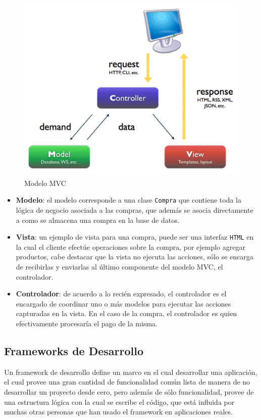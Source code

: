 \begin{figure}[!h]
  \centering
  \includegraphics[scale=.5]{images/mvc.png}
  \caption{Modelo MVC}
  \label{modelomvc}
\end{figure}

\begin{itemize}
  \item \textbf{Modelo}: el modelo corresponde a una clase \texttt{Compra} que contiene toda la lógica de negocio asociada a las compras, que además se asocia directamente a como se almacena una compra en la base de datos.
  \item \textbf{Vista}: un ejemplo de vista para una compra, puede ser una interfaz \texttt{HTML} en la cual el cliente efectúe operaciones sobre la compra, por ejemplo agregar productos, cabe destacar que la vista no ejecuta las acciones, sólo se encarga de recibirlas y enviarlas al último componente del modelo MVC, el controlador.
  \item \textbf{Controlador}: de acuerdo a lo recién expresado, el controlador es el encargado de coordinar uno o más modelos para ejecutar las acciones capturadas en la vista. En el caso de la compra, el controlador es quien efectivamente procesaría el pago de la misma.
\end{itemize}

\subsection{Frameworks de Desarrollo} %
\label{sub:frameworks_de_desarollo}
Un framework de desarrollo define un marco en el cual desarrollar una aplicación, el cual provee una gran cantidad de funcionalidad común lista de manera de no desarrollar un proyecto desde cero, pero además de sólo funcionalidad, provee de una estructura lógica con la cual se escribe el código, que está influida por muchas otras personas que han usado el framework en aplicaciones reales.

